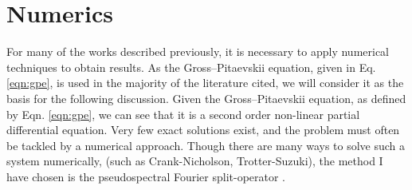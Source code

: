 \section{Numerics}\label{sec:numerics}
For many of the works described previously, it is necessary to apply numerical techniques to obtain results. As the Gross--Pitaevskii
equation, given in Eq. \eqref{eqn:gpe}, is used in the majority of the literature cited, we will consider it as the basis for the following discussion. Given the Gross--Pitaevskii equation, as defined by Eqn. \ref{eqn:gpe}, we can see that it is a second order non-linear partial differential equation. Very few exact solutions exist, and the problem must often be tackled by a numerical approach. Though there are many ways to solve such a system numerically, (such as Crank-Nicholson, Trotter-Suzuki), the method I have chosen is the pseudospectral Fourier split-operator \cite{Num:Bauke_cpc_2011}.

